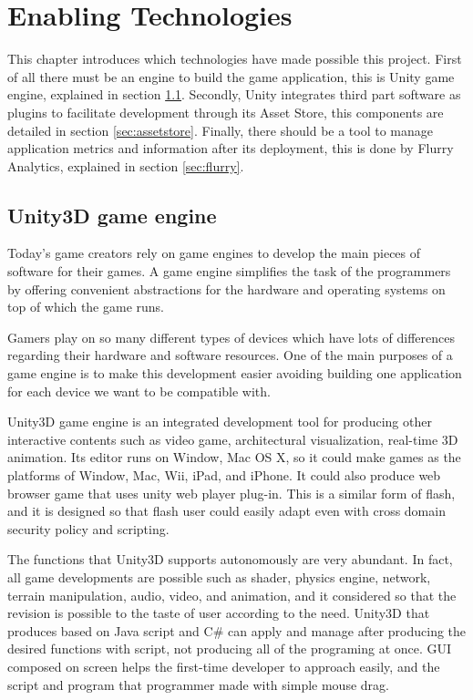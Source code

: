 
\chapter{Enabling Technologies}
\label{chap:enabling_technologies}
\begin{chapterintro}
This chapter introduces which technologies have made possible this project. First of all there must be an engine to build the game application, this is Unity game engine, explained in section \ref{sec:unity}. Secondly, Unity integrates third part software as plugins to facilitate development through its Asset Store, this components are detailed in section \ref{sec:assetstore}. Finally, there should be a tool to manage application metrics and information after its deployment, this is done by Flurry Analytics, explained in section \ref{sec:flurry}.
\end{chapterintro}

\cleardoublepage
\section{Unity3D game engine}
\label{sec:unity}
Today’s game creators rely on game engines to develop the main pieces of software for their games. A game engine simplifies the task of the programmers by offering convenient abstractions for the hardware and operating systems on top of which the game runs.~\cite{messaoudi2015dis}

Gamers play on so many different types of devices which have lots of differences regarding their hardware and software resources. One of the main purposes of a game engine is to make this development easier avoiding building one application for each device we want to be compatible with.

Unity3D game engine is an integrated development tool for producing other interactive contents such as video game, architectural visualization, real-time 3D animation. Its editor runs on Window, Mac OS X, so it could make games as the platforms of Window, Mac, Wii, iPad, and iPhone. It could also produce web browser game that uses unity web player plug-in. This is a similar form of flash, and it is designed so that flash user could easily adapt even with cross domain security policy and scripting.

The functions that Unity3D supports autonomously are very abundant. In fact, all game developments are possible such as shader, physics engine, network, terrain manipulation, audio, video, and animation, and it considered so that the revision is possible to the taste of user according to the need. Unity3D that produces based on Java script and C\# can apply and manage after producing the desired functions with script, not producing all of the programing at once. GUI composed on screen helps the first-time developer to approach easily, and the script and program that programmer made with simple mouse drag.~\cite{kim2014dev}

